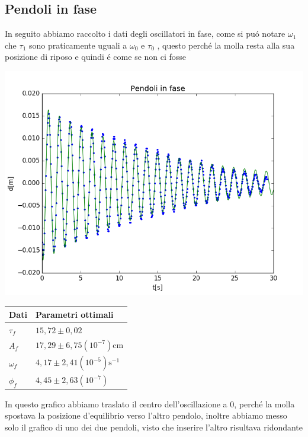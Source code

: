 \documentclass{exam}
\begin{document}
			\subsection{Pendoli in fase}
			In seguito abbiamo raccolto i dati degli oscillatori in fase, come si pu\'o notare $\omega_{1}$ che $\tau_{1}$ sono praticamente uguali a $\omega_{0}$ e $\tau_{0}$ , questo perch\'e la molla resta alla sua posizione di riposo e quindi \'e come se non ci fosse\\
			\begin{minipage}{0.5\textwidth}
				\includegraphics[width=\textwidth]{fase}
			\end{minipage}
			\begin{minipage}{0.5\textwidth}
				\begin{tabular}{ll}
					\toprule
					Dati & Parametri ottimali \\
					\midrule
					$\tau_{f}$ & $15,72 \pm 0,02$ \\
					$A_{f}$ & $17,29 \pm 6,75(10^{-7})$cm\\
					$\omega_{f}$ & $4,17 \pm 2,41(10^{-5})\textrm{s}^{-1}$\\			
					$\phi_{f}$ & $4,45 \pm 2,63(10^{-7})$\\
					\bottomrule
				\end{tabular}
			\end{minipage}
			In questo grafico abbiamo traslato il centro dell'oscillazione a 0, perch\'e la molla spostava la posizione d'equilibrio verso l'altro pendolo, inoltre abbiamo messo solo il grafico di uno dei due pendoli, visto che inserire l'altro risultava ridondante
\end{document}
